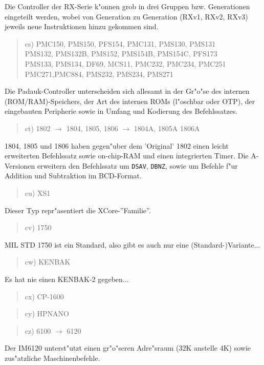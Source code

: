 \documentclass[12pt,a4paper,twoside]{report}
\newcommand{\tty}[1]{{\tt #1}}
\begin{document}
Die Controller der RX-Serie k"onnen grob in drei
Gruppen bzw. Generationen eingeteilt werden, wobei
von Generation zu Generation (RXv1, RXv2, RXv3)
jeweils neue Instruktionen hinzu gekommen sind.
\begin{quote}
cs) PMC150, PMS150, PFS154, PMC131, PMS130, PMS131 \\
PMS132, PMS132B, PMS152, PMS154B, PMS154C, PFS173 \\
PMS133, PMS134, DF69, MCS11, PMC232, PMC234, PMC251 \\
PMC271,PMC884, PMS232, PMS234, PMS271
\end{quote}
Die Padauk-Controller unterscheiden sich allesamt in
der Gr"o"se des internen (ROM/RAM)-Speichers, der Art
des internen ROMs (l"oschbar oder OTP), der eingebauten
Peripherie sowie in Umfang und Kodierung des Befehlssatzes.
\begin{quote}
ct) 1802 $\rightarrow$ 1804, 1805, 1806 $\rightarrow$ 1804A, 1805A
1806A
\end{quote}
1804, 1805 und 1806 haben gegen"uber dem 'Original' 1802 einen leicht
erweiterten Befehlssatz sowie on-chip-RAM und einen integrierten
Timer.  Die A-Versionen erweitern den Befehlssatz um \tty{DSAV},
\tty{DBNZ}, sowie um Befehle f"ur Addition und Subtraktion im
BCD-Format.
\begin{quote}
cu) XS1
\end{quote}
Dieser Typ repr"asentiert die XCore-''Familie''.
\begin{quote}
cv) 1750
\end{quote}
MIL STD 1750 ist ein Standard, also gibt es auch nur eine
(Standard-)Variante...
\begin{quote}
cw) KENBAK
\end{quote}
Es hat nie einen KENBAK-2 gegeben...
\begin{quote}
cx) CP-1600
\end{quote}
\begin{quote}
cy) HPNANO
\end{quote}
\begin{quote}
cz) 6100 $\rightarrow$ 6120
\end{quote}
Der IM6120 unterst"utzt einen gr"o"seren Adre"sraum (32K
anstelle 4K) sowie zus"atzliche Maschinenbefehle.
\end{document}
